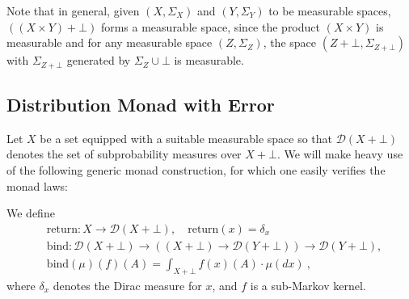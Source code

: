 Note that in general, given $(X, \Sigma_X)$ and $(Y, \Sigma_Y)$ to be measurable spaces, $((X \times Y) + \bot)$ forms a measurable space, since the product $(X \times Y)$ is measurable and for any measurable space $(Z, \Sigma_Z)$, the space $(Z + \bot, \Sigma_{Z + \bot})$ with $\Sigma_{Z + \bot}$ generated by $\Sigma_Z \cup {{\bot}}$ is measurable. 

\subsection{Distribution Monad with Error}

Let $X$ be a set equipped with a suitable measurable space so that $\mathcal{D}(X + \bot)$ denotes the set of subprobability measures over $X + \bot$. We will make heavy use of the following generic monad construction, for which one easily verifies the monad laws:

\begin{definition}
	\label{def:dist-monad}
	We define 
	\begin{align*}
		& \text{return} \colon X \to \mathcal{D}(X + \bot), \quad \text{return}(x) = \delta_x \\
		& \text{bind} \colon \mathcal{D}(X + \bot) \to ((X + \bot) \to \mathcal{D}(Y + \bot)) \to \mathcal{D}(Y + \bot), \\
		&\text{bind}(\mu)(f)(A) = \int_{X + \bot} f(x)(A) \cdot \mu(dx)~,
	\end{align*}
	where $\delta_x$ denotes the Dirac measure for $x$, and $f$ is a sub-Markov kernel.
%	
\end{definition}

